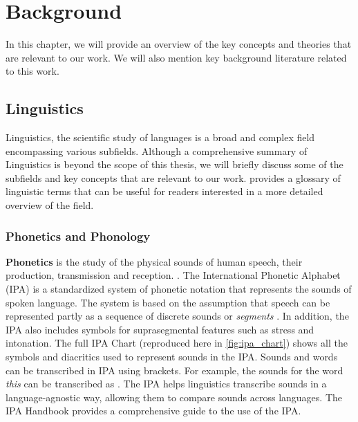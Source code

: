 \chapter{Background}\label{chapter:background}
In this chapter, we will provide an overview of the key concepts and theories that are relevant to our work. We will also mention key background 
literature related to this work.

\section{Linguistics}
Linguistics, the scientific study of languages is a broad and complex field encompassing various subfields. Although a comprehensive summary 
of Linguistics is beyond the scope of this thesis, we will briefly discuss some of the subfields and key concepts that are relevant to our work.
\cite{trask2007language} provides a glossary of linguistic terms that can be useful for readers interested in a more detailed overview of the field.

\subsection{Phonetics and Phonology}
\textbf{Phonetics} is the study of the physical sounds of human speech, their production, transmission and reception. \cite{trask2007language}. 
The International Phonetic Alphabet (IPA) is a standardized system of phonetic notation that represents the sounds of spoken language. The system
is based on the assumption that speech can be represented partly as a sequence of discrete sounds or \textit{segments} \cite{handbookIPA1999}. 
In addition, the IPA also includes symbols for suprasegmental features such as stress and intonation. The full IPA Chart (reproduced here in 
\ref{fig:ipa_chart}) shows all the symbols and diacritics used to represent sounds in the IPA. Sounds and words can be transcribed in IPA 
using \textipa{[ ]} brackets. For example, the sounds for the word \textit{this} can be transcribed as \textipa{[DIs]}. The IPA helps linguistics
transcribe sounds in a language-agnostic way, allowing them to compare sounds across languages. The IPA Handbook \cite{handbookIPA1999} provides
a comprehensive guide to the use of the IPA.

